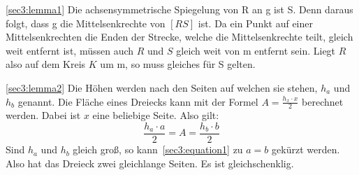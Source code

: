 \documentclass[10pt, a4paper]{amsart}
\newenvironment{proof thm}[1]{
\begin{proof}[\proofname~(#1)]}{\end{proof}}
\begin{document}
\begin{proof thm}{\autoref{sec3:lemma1}}
  Die achsensymmetrische Spiegelung von R an g ist S. Denn daraus folgt, dass g
  die Mittelsenkrechte von $[RS]$ ist. Da ein Punkt auf einer Mittelsenkrechten
  die Enden der Strecke, welche die Mittelsenkrechte teilt, gleich weit entfernt
  ist, müssen auch $R$ und $S$ gleich weit von m entfernt sein. Liegt $R$ also
  auf dem Kreis $K$ um m, so muss gleiches für S gelten.
\end{proof thm}
\begin{proof thm}{\autoref{sec3:lemma2}}
  Die Höhen werden nach den Seiten auf welchen sie stehen, $h_a$ und $h_b$
  genannt. Die Fläche eines Dreiecks kann mit der Formel $A=\frac{h_x\cdot x}{2}$
  berechnet werden. Dabei ist $x$ eine beliebige Seite. Also gilt:
  \begin{equation}\label{sec3:equation1}
    \dfrac{h_a\cdot a}{2}=A=\dfrac{h_b\cdot b}{2}
  \end{equation}
  Sind $h_a$ und $h_b$ gleich groß, so kann~\eqref{sec3:equation1} zu $a=b$
  gekürzt werden. Also hat das Dreieck zwei gleichlange Seiten. Es ist
  gleichschenklig.
\end{proof thm}
\end{document}

